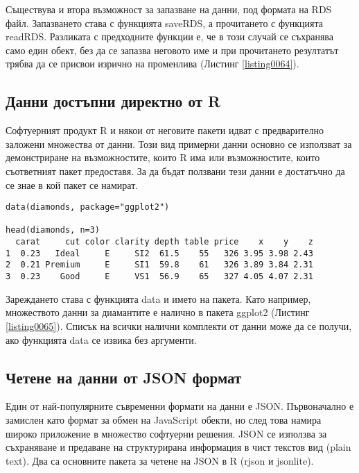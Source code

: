 Съществува и втора възможност за запазване на данни, под формата на RDS файл. Запазването става с функцията saveRDS, а прочитането с функцията readRDS. Разликата с предходните функции е, че в този случай се съхранява само един обект, без да се запазва неговото име и при прочитането резултатът трябва да се присвои изрично на променлива (Листинг \ref{listing0064}).

\subsection{Данни достъпни директно от R}

Софтуерният продукт R и някои от неговите пакети идват с предварително заложени множества от данни. Този вид примерни данни основно се използват за демонстриране на възможностите, които R има или възможностите, които съответният пакет предоставя. За да бъдат ползвани тези данни е достатъчно да се знае в кой пакет се намират.

\begin{lstlisting}[caption=Зареждане на примерни данни, label=listing0065]
data(diamonds, package="ggplot2")

head(diamonds, n=3)
  carat     cut color clarity depth table price    x    y    z
1  0.23   Ideal     E     SI2  61.5    55   326 3.95 3.98 2.43
2  0.21 Premium     E     SI1  59.8    61   326 3.89 3.84 2.31
3  0.23    Good     E     VS1  56.9    65   327 4.05 4.07 2.31
\end{lstlisting}

Зареждането става с функцията data и името на пакета. Като например, множеството данни за диамантите е налично в пакета ggplot2 (Листинг \ref{listing0065}). Списък на всички налични комплекти от данни може да се получи, ако функцията data се извика без аргументи.

\subsection{Четене на данни от JSON формат}

Един от най-популярните съвременни формати на данни е JSON\cite{json}. Първоначално е замислен като формат за обмен на JavaScript обекти, но след това намира широко приложение в множество софтуерни решения. JSON се използва за съхраняване и предаване на структурирана информация в чист текстов вид (plain text). Два са основните пакета за четене на JSON в R (rjson и jsonlite).

